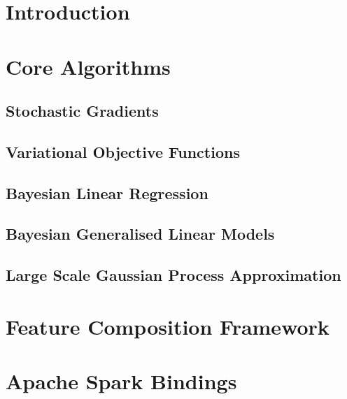 \documentclass[11pt, oneside]{article}
\title{\sffamily{\emph{revrand}: Technical Report}}
\author{Daniel Steinberg, Louis Tiao, Dave Cole\\ 
    Data61 $|$ CSIRO \\
    email: \texttt{\{firstname.lastname\}@data61.csiro.au}
}
\date{}
\begin{document}
\maketitle
\vspace{-0.5cm}
\noindent\makebox[\linewidth]{\rule{\linewidth}{0.8pt}}


\tableofcontents

\section{Introduction}

\section{Core Algorithms}

\subsection{Stochastic Gradients}

\subsection{Variational Objective Functions}

\subsection{Bayesian Linear Regression}

\subsection{Bayesian Generalised Linear Models}

\subsection{Large Scale Gaussian Process Approximation}

\section{Feature Composition Framework}

\section{Apache Spark Bindings}
\end{document}
